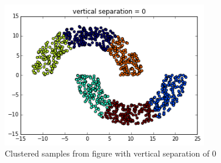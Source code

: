 \documentclass[paper=a4, fontsize=11pt]{scrartcl} %
\numberwithin{equation}{section} %
\numberwithin{figure}{section} %
\numberwithin{table}{section} %
\begin{document}
\begin{figure}[ht]
	\centering
  \includegraphics[width=0.8\textwidth]{v0.png}
	\caption{Clustered samples from figure with vertical separation of 0}
	\label{figv0}
\end{figure}
\end{document}
